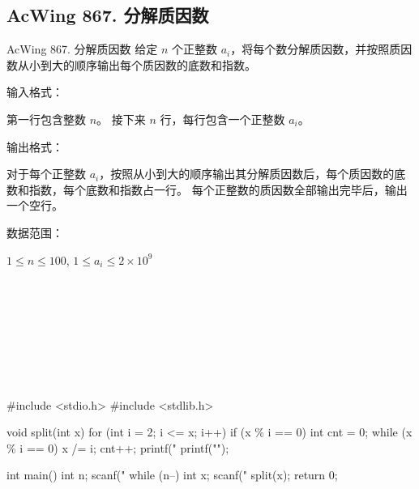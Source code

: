 \subsection{AcWing 867. 分解质因数}
\begin{titledbox}{AcWing 867. 分解质因数}
    给定 $n$ 个正整数 $a_i$，将每个数分解质因数，并按照质因数从小到大的顺序输出每个质因数的底数和指数。

    输入格式：

    第一行包含整数 $n$。 接下来 $n$ 行，每行包含一个正整数 $a_i$。

    输出格式：

    对于每个正整数 $a_i$，按照从小到大的顺序输出其分解质因数后，每个质因数的底数和指数，每个底数和指数占一行。 每个正整数的质因数全部输出完毕后，输出一个空行。

    数据范围：

    $1 \le n \le 100$, $1 \le a_i \le 2 \times 10^9$

    \begin{inputblock}
         \\
         \\
    \end{inputblock}
    \begin{outputblock}
         \\
         \\
        \\
         \\

    \end{outputblock}
\end{titledbox}

\begin{mycpptwocol}[试除法分解质因数]
    #include <stdio.h>
    #include <stdlib.h>

    void split(int x) {
        for (int i = 2; i <= x; i++) {
            if (x \% i == 0) {
                int cnt = 0;
                while (x \% i == 0) {
                    x /= i;
                    cnt++;
                }
                printf("%
            }
        }
        printf("\n");
    }

    int main() {
        int n;
        scanf("%
        while (n--) {
            int x;
            scanf("%
            split(x);
        }
        return 0;
    }
\end{mycpptwocol}

